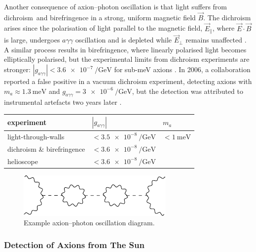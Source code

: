 Another consequence of axion--photon oscillation is that light suffers from dichroism\footnotemark\ and birefringence in a strong, uniform magnetic field $\vec B$.
The dichroism arises since the polarisation of light parallel to the magnetic field, $\vec E_\parallel$, where $\vec E \cdot \vec B$ is large, undergoes $aγγ$ oscillation and is depleted while $\vec E_\perp$ remains unaffected \cite[§\,91.3.2]{ParticleDataGroup-review-2020}.
A similar process results in birefringence, where linearly polarised light becomes elliptically polarised, but the experimental limits from dichroism experiments are stronger: $|g_{aγγ}| < \SI{3.6e-7}{\per\giga\eV}$ for sub-\si{\milli\eV} axions \cite{axion_dichromism}.
In 2006, a collaboration reported a false positive in a vacuum dichroism experiment, detecting axions with $m_a \approx \SI{1.3}{\milli\eV}$ and $g_{aγγ} = \SI{3e-6}{\per\giga\eV}$, but the detection was attributed to instrumental artefacts two years later \cite{birefringence_false_positive_2008}.



\begin{table}[h]
	\centering
	\begin{tabular}{lll}
		\textbf{experiment} & $|g_{aγγ}|$ & $m_a$ \\
		\hline
		light-through-walls & $< \SI{3.5e-8}{\per\giga\eV}$ & $< \SI{1}{\milli\eV}$ \\
		dichroism \& birefringence & $< \SI{3.6e-8}{\per\giga\eV}$ \\ 
		helioscope & $< \SI{3.6e-8}{\per\giga\eV}$
	\end{tabular}
\end{table}

\begin{figure}
	\centering
	\includegraphics{diagrams/axion-photon-oscillation.pdf}
	\caption{Example axion--photon oscillation diagram.}
	\label{fig:axion-photon-oscillation}
\end{figure}


\subsubsection{Detection of Axions from The Sun}

